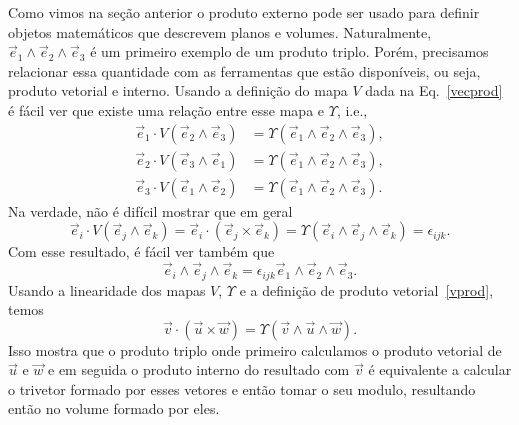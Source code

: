 Como vimos na seção anterior o produto externo pode ser usado para definir
objetos matemáticos que descrevem planos e volumes. Naturalmente,
$\vec{e}_1\wedge\vec{e}_2\wedge\vec{e}_3$ é um primeiro exemplo de um produto
triplo. Porém, precisamos relacionar essa quantidade com as ferramentas que
estão disponíveis, ou seja, produto vetorial e interno. Usando a definição do
mapa $V$ dada na Eq.~\eqref{vecprod} é fácil ver que existe uma relação entre
esse mapa e $\Upsilon$, i.e.,
\begin{align*}
	\vec{e}_1\cdot V(\vec{e}_2\wedge\vec{e}_3) & = \Upsilon(\vec{e}_1\wedge\vec{e}_2\wedge\vec{e}_3), \\
	\vec{e}_2\cdot V(\vec{e}_3\wedge\vec{e}_1) & = \Upsilon(\vec{e}_1\wedge\vec{e}_2\wedge\vec{e}_3), \\
	\vec{e}_3\cdot V(\vec{e}_1\wedge\vec{e}_2) & = \Upsilon(\vec{e}_1\wedge\vec{e}_2\wedge\vec{e}_3).
\end{align*}
Na verdade, não é difícil mostrar que em geral
\begin{equation}\label{VandU}
	\vec{e}_i\cdot V(\vec{e}_j\wedge\vec{e}_k) = \vec{e}_i\cdot (\vec{e}_j\times\vec{e}_k) = \Upsilon(\vec{e}_i\wedge\vec{e}_j\wedge\vec{e}_k) = \epsilon_{ijk}.
\end{equation}
Com esse resultado, é fácil ver também que
\begin{equation}\label{trieps}
	\vec{e}_i\wedge\vec{e}_j\wedge\vec{e}_k = \epsilon_{ijk} \vec{e}_1\wedge\vec{e}_2\wedge\vec{e}_3.
\end{equation}
Usando a linearidade dos mapas $V$, $\Upsilon$ e a definição de produto
vetorial~\eqref{vprod}, temos
\begin{equation}\label{VandUv}
	\vec{v}\cdot(\vec{u}\times\vec{w}) = \Upsilon(\vec{v}\wedge\vec{u}\wedge\vec{w}).
\end{equation}
Isso mostra que o produto triplo onde primeiro calculamos o produto vetorial de
$\vec{u}$ e $\vec{w}$ e em seguida o produto interno do resultado com $\vec{v}$
é equivalente a calcular o trivetor formado por esses vetores e então tomar o
seu modulo, resultando então no volume formado por eles.


